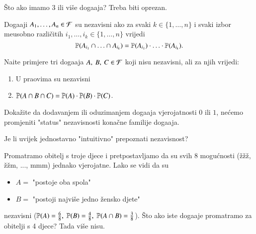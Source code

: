 \v Sto ako imamo 3 ili vi\v se doga\dj aja?
Treba biti oprezan.

\begin{defn}    \label{defn:6.3-1}
    Doga\dj aji $A_1, \ldots, A_n \in \mathcal{F}$ su nezavisni ako za svaki $k \in \{1, \ldots, n\}$ i svaki izbor me\dj usobno razli\v citih $i_1, \ldots, i_k \in \{1, \ldots, n\}$ vrijedi
    \begin{equation*}
        \mathbb{P}({A_{i_1} \cap \ldots  \cap A_{i_k}}) = \mathbb{P}({A_{i_1}}) \cdot \ldots \cdot \mathbb{P}({A_{i_k}}).
    \end{equation*}    
\end{defn}

\begin{zad} \label{zad:6.4}
    Na\dj ite primjere tri doga\dj aja $A, \: B, \: C \in \mathcal{F}$ koji nisu nezavisni, ali za njih vrijedi:
    \begin{enumerate}[label=(\roman*)]
        \item U praovima su nezavisni
        \item $\mathbb{P}({A \cap B \cap C}) = \mathbb{P}({A}) \cdot \mathbb{P}({B}) \cdot \mathbb{P}({C})$.
    \end{enumerate}
\end{zad}

\begin{zad} \label{zad:6.5}
    Doka\v zite da dodavanjem ili oduzimanjem doga\dj aja vjerojatnosti $0$ ili $1$, ne\' cemo promjeniti "status" nezavisnosti kona\v cne familije doga\dj aja.
\end{zad}

Je li uvijek jednostavno "intuitivno" prepoznati nezavisnost?

\begin{pr}  \label{pr:6.6}
    Promatramo obitelj s troje djece i pretpostavljamo da su svih 8 mogu\' cnosti (\v z\v z\v z, \v z\v zm, ..., mmm) jednako vjerojatne.
    Lako se vidi da su
    \begin{itemize}
        \item[] $A =$ "postoje oba spola"
        \item[] $B = $ "postoji najvi\v se jedno \v zensko djete"
    \end{itemize}
    nezavisni ($\mathbb{P}({A}) = \frac{6}{8}, \; \mathbb{P}({B}) = \frac{4}{8}, \; \mathbb{P}({A \cap B}) = \frac{3}{8}$).
    \v Sto ako iste doga\dj aje promatramo za obitelji s 4 djece? Tada vi\v se nisu.
\end{pr}


